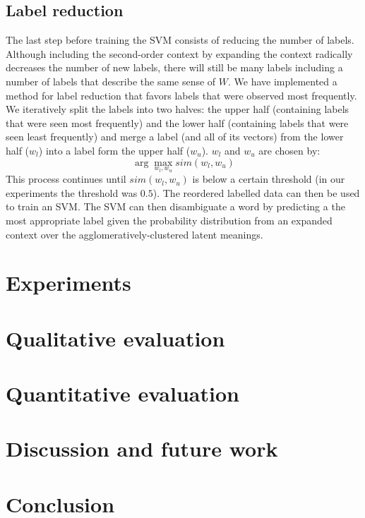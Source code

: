\documentclass[11pt]{article}
\begin{document}
\subsection{Label reduction}
The last step before training the SVM consists of reducing the number of labels. Although including the second-order context by expanding the context radically decreases the number of new labels, there will still be many labels including a number of labels that describe the same sense of $W$. We have implemented a method for label reduction that favors labels that were observed most frequently. We iteratively split the labels into two halves: the upper half (containing labels that were seen most frequently) and the lower half (containing labels that were seen least frequently) and merge a label (and all of its vectors) from the lower half ($w_l$) into a label form the upper half ($w_u$). $w_l$ and $w_u$ are chosen by: 
$$\arg\max_{w_l, w_u} \textit{sim}(w_l, w_u)$$
This process continues until $\textit{sim}(w_l, w_u)$ is below a certain threshold (in our experiments the threshold was $0.5$).
The reordered labelled data can then be used to train an SVM. The SVM can then disambiguate a word by predicting a the most appropriate label given the probability distribution from an expanded context over the agglomeratively-clustered latent meanings. 

\section{Experiments}
\section{Qualitative evaluation}

\section{Quantitative evaluation}

\section{Discussion and future work}
\section{Conclusion}



\end{document}
